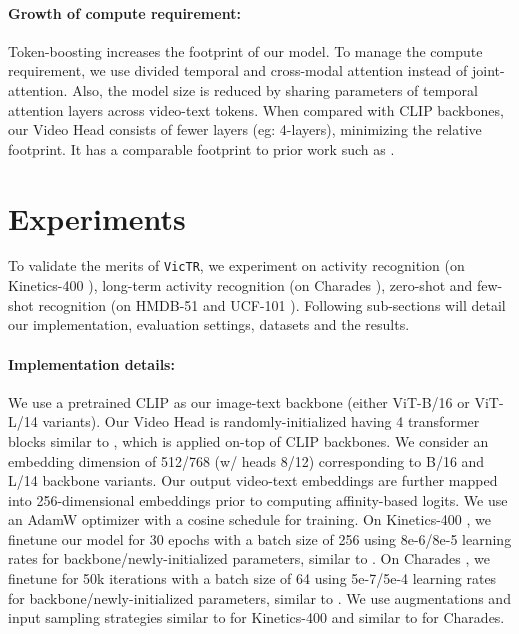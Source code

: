 \documentclass[10pt,twocolumn,letterpaper]{article}
\newcommand{\ours}{\texttt{VicTR}}
\begin{document}
\paragraph{Growth of compute requirement:} Token-boosting increases the footprint of our model. To manage the compute requirement, we use divided temporal and cross-modal attention instead of joint-attention. Also, the model size is reduced by sharing parameters of temporal attention layers across video-text tokens. When compared with CLIP \cite{radford2021clip} backbones, our Video Head consists of fewer layers (eg: 4-layers), minimizing the relative footprint. It has a comparable footprint to prior work such as \cite{lin2022evl, ma2022xclip}.


\section{Experiments}
\label{sec:experiments}

To validate the merits of \ours, we experiment on activity recognition (on Kinetics-400 \cite{kay2017kinetics}), long-term activity recognition (on Charades \cite{sigurdsson2016hollywood}), zero-shot and few-shot recognition (on HMDB-51 \cite{kuehne2011hmdb} and UCF-101 \cite{soomro2012ucf101}). Following sub-sections will detail our implementation, evaluation settings, datasets and the results.

\paragraph{Implementation details:} We use a pretrained CLIP \cite{radford2021clip} as our image-text backbone (either ViT-B/16 or ViT-L/14 variants). Our Video Head is randomly-initialized having 4 transformer blocks similar to \cite{wang2021actionclip}, which is applied on-top of CLIP backbones. We consider an embedding dimension of 512/768 (w/ heads 8/12) corresponding to B/16 and L/14 backbone variants. Our output video-text embeddings are further mapped into 256-dimensional embeddings prior to computing affinity-based logits. We use an AdamW \cite{loshchilov2017adamw} optimizer with a cosine schedule for training. On Kinetics-400 \cite{kay2017kinetics}, we finetune our model for 30 epochs with a batch size of 256 using 8e-6/8e-5 learning rates for backbone/newly-initialized parameters, similar to \cite{ma2022xclip}. On Charades \cite{sigurdsson2016hollywood}, we finetune for 50k iterations with a batch size of 64 using 5e-7/5e-4 learning rates for backbone/newly-initialized parameters, similar to \cite{bain2022cliphitchhiker}. We use augmentations and input sampling strategies similar to \cite{ma2022xclip} for Kinetics-400 and similar to \cite{lin2022evl} for Charades.
\end{document}
